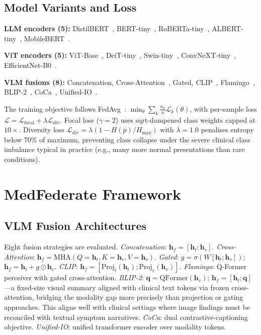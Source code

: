 \documentclass[conference]{IEEEtran}
\begin{document}
\subsection{Model Variants and Loss}

\textbf{LLM encoders (5):} DistilBERT~\cite{Sanh2019},
BERT-tiny~\cite{Devlin2019}, RoBERTa-tiny~\cite{Liu2019roberta},
ALBERT-tiny~\cite{Lan2020}, MobileBERT~\cite{Sun2020}.

\textbf{ViT encoders (5):} ViT-Base~\cite{Dosovitskiy2021},
DeiT-tiny~\cite{Touvron2021}, Swin-tiny~\cite{Liu2021swin},
ConvNeXT-tiny~\cite{Liu2022convnext}, EfficientNet-B0~\cite{Tan2019}.

\textbf{VLM fusions (8):} Concatenation, Cross-Attention~\cite{Vaswani2017},
Gated, CLIP~\cite{Radford2021}, Flamingo~\cite{Alayrac2022},
BLIP-2~\cite{Li2023blip}, CoCa~\cite{Yu2022}, Unified-IO~\cite{Lu2022}.

The training objective follows FedAvg~\cite{McMahan2017}:
$\min_\theta\sum_k\frac{n_k}{n}\mathcal{L}_k(\theta)$, with per-sample
loss $\mathcal{L}{=}\mathcal{L}_{\mathrm{focal}}{+}\lambda\mathcal{L}_{\mathrm{div}}$.
Focal loss ($\gamma{=}2$) uses sqrt-dampened class weights capped at
$10{\times}$. Diversity loss
$\mathcal{L}_{\mathrm{div}}{=}\lambda(1{-}H(\bar{p})/H_{\max})$
with $\lambda{=}1.0$ penalises entropy below 70\% of maximum, preventing
class collapse under the severe clinical class imbalance typical in practice
(e.g., many more normal presentations than rare conditions).

\section{MedFederate Framework}

\subsection{VLM Fusion Architectures}

Eight fusion strategies are evaluated. \textit{Concatenation}:
$\mathbf{h}_f{=}[\mathbf{h}_t;\mathbf{h}_v]$. \textit{Cross-Attention}:
$\mathbf{h}_f{=}\mathrm{MHA}(Q{=}\mathbf{h}_t,K{=}\mathbf{h}_v,V{=}\mathbf{h}_v)$.
\textit{Gated}: $g{=}\sigma(W[\mathbf{h}_t;\mathbf{h}_v])$;
$\mathbf{h}_f{=}\mathbf{h}_t{+}g\!\odot\!\mathbf{h}_v$.
\textit{CLIP}: $\mathbf{h}_f{=}[\mathrm{Proj}_t(\mathbf{h}_t);\mathrm{Proj}_v(\mathbf{h}_v)]$.
\textit{Flamingo}: Q-Former perceiver with gated cross-attention.
\textit{BLIP-2}: $\mathbf{q}{=}\mathrm{QFormer}(\mathbf{h}_v)$;
$\mathbf{h}_f{=}[\mathbf{h}_t;\mathbf{q}]$---a fixed-size visual summary
aligned with clinical text tokens via frozen cross-attention, bridging the
modality gap more precisely than projection or gating approaches.
This aligns well with clinical settings where image findings must be
reconciled with textual symptom narratives.
\textit{CoCa}: dual contrastive-captioning objective.
\textit{Unified-IO}: unified transformer encoder over modality tokens.
\end{document}
